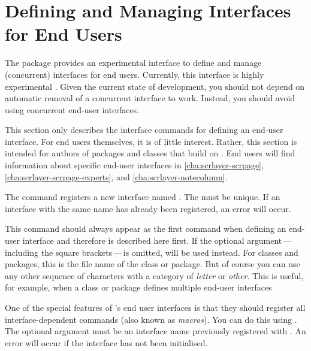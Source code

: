 \section{Defining and Managing Interfaces for End Users}

The  package provides an experimental interface to define
and manage (concurrent) interfaces for end users.  Currently, this interface is highly
experimental%
%
. Given the current state of development, you should not depend on automatic
removal of a concurrent interface to work. Instead, you should avoid using
concurrent end-user interfaces.

This section only describes the interface commands for defining an end-user
interface. For end users themselves, it is of little interest. Rather, this
section is intended for authors of packages and classes that build on
. End users will find information about specific end-user
interfaces in \autoref{cha:scrlayer-scrpage},
\autoref{cha:scrlayer-scrpage-experts}, and \autoref{cha:scrlayer-notecolumn}.

\begin{Declaration}
\end{Declaration}
The  command registers a new interface named
. The  must be unique. If an
interface with the same name has already been registered, an error will occur.

This command should always appear as the first command when defining an
end-user interface and therefore is described here first. If the optional
argument\,---\,including the square brackets\,---\,is omitted,
 will be used instead. For classes
and packages, this is the file name of the class or package. But of course you
can use any other sequence of characters with a category of \emph{letter} or
\emph{other}. This is useful, for example, when a class or package defines
multiple end-user interfaces%
\EndIndexGroup


\begin{Declaration}
\end{Declaration}
One of the special features of 's end user interfaces is
that they should register all interface-dependent commands (also known as
\emph{macros}). You can do this using . The
optional argument  must be an interface name previously
registered with . An error will
occur if the interface has not been initialised.

